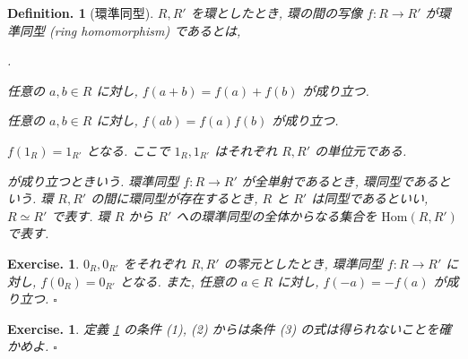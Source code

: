 \documentclass[openany, a4paper, oneside]{jsbook}
\newcounter{enum2}
\renewenvironment{enumerate}{%
\begin{list}%
{%
\arabic{enum2}.\ \,%
}%
{%
\usecounter{enum2}
\setlength{\itemindent}{0pt}%
\setlength{\leftmargin}{15pt}%
\setlength{\rightmargin}{0pt}%
\setlength{\labelsep}{0pt}%
\setlength{\labelwidth}{6pt}%
\setlength{\itemsep}{0pt}%
\setlength{\parsep}{0pt}%
\setlength{\listparindent}{0pt}%
}
}{%
\end{list}%
}
\theoremstyle{break}
\theoremstyle{breakdefn}
\newtheorem{defn}[thm]{Definition.}
\newtheorem{exercise}[thm]{Exercise.}
\newcommand{\fin}{\hfill $\square$ \par}
\newcommand{\homo}{\mathrm{Hom}}
\begin{document}
\begin{defn}[環準同型]\label{waheyhey-algebraic-geometry-guidance1}
$R,R'$ を環としたとき, 環の間の写像 $f \colon R \to R'$ が環準同型 (ring homomorphism) であるとは,
\begin{enumerate}
\item 任意の $a,b \in R$ に対し, $f (a+b)=f (a) +f (b)$ が成り立つ.
\item 任意の $a,b\in R$ に対し, $f (ab)=f (a) f (b)$ が成り立つ.
\item $f (1_R)=1_{R'}$ となる.
   ここで $1_R, 1_{R'}$ はそれぞれ $R, R'$ の単位元である.
\end{enumerate}
が成り立つときいう.
環準同型 $f \colon R \to R'$ が全単射であるとき, 環同型であるという.
環 $R,R'$ の間に環同型が存在するとき, $R$ と $R'$ は同型であるといい, $R \simeq R'$ で表す.
環 $R$ から $R'$ への環準同型の全体からなる集合を $\homo (R,R')$ で表す.
\end{defn}
\begin{exercise}
$0_R, 0_{R'}$ をそれぞれ $R, R'$ の零元としたとき,
環準同型 $f:R\to R'$ に対し, $f (0_R)=0_{R'}$ となる.
また, 任意の $a \in R$ に対し, $f (-a)=-f (a)$ が成り立つ. \fin
\end{exercise}
\begin{exercise}
定義 \ref{waheyhey-algebraic-geometry-guidance1} の条件 (1), (2) からは条件 (3) の式は得られないことを確かめよ. \fin
\end{exercise}
\end{document}

